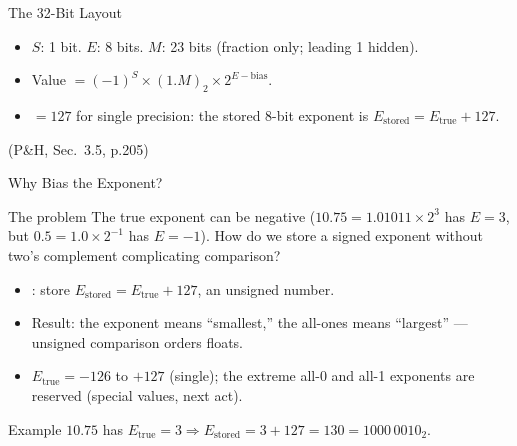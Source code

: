 \documentclass[aspectratio=169]{beamer}
\begin{document}
\begin{frame}{The 32-Bit Layout}
  \begin{center}
  \end{center}
  \begin{itemize}
    \item {} $S$: 1 bit.  $E$: 8 bits. 
      $M$: 23 bits (fraction only; leading 1 hidden).
    \item Value $= (-1)^S \times (1.M)_2 \times 2^{E-\text{bias}}$.
    \item {} $= 127$ for single precision: the stored 8-bit exponent is
      $E_{\text{stored}} = E_{\text{true}} + 127$.
  \end{itemize}
  (P\&H, Sec.~3.5, p.205) \cite{PattersonHennessy2017_computer_organization_design}
\end{frame}

\begin{frame}{Why Bias the Exponent?}
  \begin{block}{The problem}
    The true exponent can be negative ($10.75 = 1.01011 \times 2^3$ has $E=3$,
    but $0.5 = 1.0 \times 2^{-1}$ has $E=-1$). How do we store a signed
    exponent without two's complement complicating comparison?
  \end{block}
  \begin{itemize}
    \item {}: store $E_{\text{stored}} = E_{\text{true}} + 127$, an
      unsigned number.
    \item Result: the  exponent means ``smallest,'' the
      all-ones means ``largest'' --- unsigned comparison orders floats.
    \item $E_{\text{true}} = -126$ to $+127$ (single); the extreme all-0 and
      all-1 exponents are reserved (special values, next act).
  \end{itemize}
  \begin{exampleblock}{Example}
    $10.75$ has $E_{\text{true}}=3 \Rightarrow E_{\text{stored}} = 3+127 =
    130 = 1000\,0010_2$.
  \end{exampleblock}
\end{frame}
\end{document}
